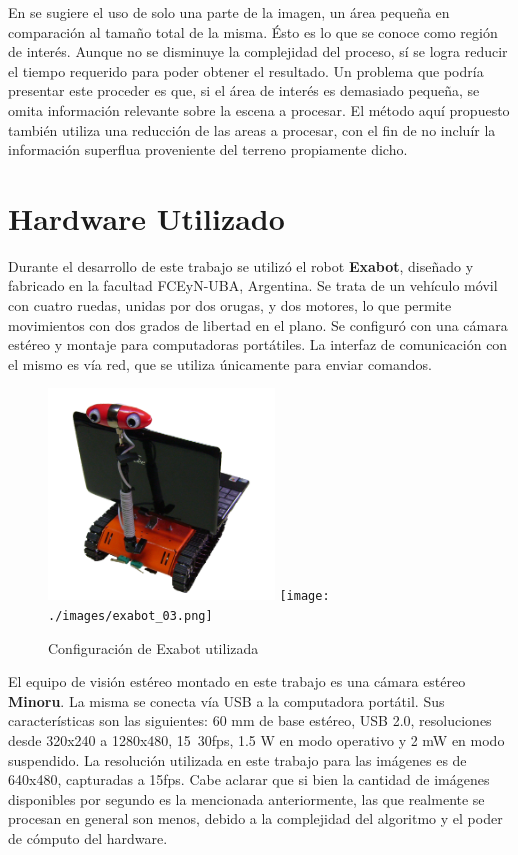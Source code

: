 \documentclass[journal]{IEEEtran}
\begin{document}
En \cite{H09} se sugiere el uso de solo una parte de la imagen, un \'area peque\~na en comparaci\'on al tama\~no total de la misma. \'Esto es lo que se conoce como regi\'on de inter\'es. Aunque no se disminuye la complejidad del proceso, sí se logra reducir el tiempo requerido para poder obtener el resultado. Un problema que podr\'ia presentar este proceder es que, si el \'area de inter\'es es demasiado peque\~na, se omita informaci\'on relevante sobre la escena a procesar. El m\'etodo aqu\'i propuesto tambi\'en utiliza una reducci\'on de las areas a procesar, con el fin de no inclu\'ir la informaci\'on superflua proveniente del terreno propiamente dicho.

\section{Hardware Utilizado}
\label{sec:hardware}


Durante el desarrollo de este trabajo se utiliz\'o el robot {\bf Exabot}, dise\~nado y fabricado en la facultad FCEyN-UBA, Argentina. Se trata de un veh\'iculo m\'ovil con cuatro ruedas, unidas por dos orugas, y dos motores, lo que permite movimientos con dos grados de libertad en el plano. Se configur\'o con una c\'amara est\'ereo y montaje para computadoras port\'atiles. La interfaz de comunicaci\'on con el mismo es v\'ia red, que se utiliza \'unicamente para enviar comandos.

\begin{figure}[ht]
	\begin{center}
		\includegraphics[width=6cm]{./images/exabot_04.png}
		\texttt{[image: ./images/exabot\_03.png]}
		\caption{Configuraci\'on de Exabot utilizada}
	\end{center}
\end{figure}

El equipo de visi\'on est\'ereo montado en este trabajo es una c\'amara est\'ereo {\bf Minoru}. La misma se conecta v\'ia USB a la computadora port\'atil. Sus caracter\'isticas son las siguientes: 60 mm de base est\'ereo, USB 2.0, resoluciones desde 320x240 a 1280x480, 15~30fps, 1.5 W en modo operativo y 2 mW en modo suspendido. La resoluci\'on utilizada en este trabajo para las im\'agenes es de 640x480, capturadas a 15fps. Cabe aclarar que si bien la cantidad de im\'agenes disponibles por segundo es la mencionada anteriormente, las que realmente se procesan en general son menos, debido a la complejidad del algoritmo y el poder de c\'omputo del hardware.
\end{document}
